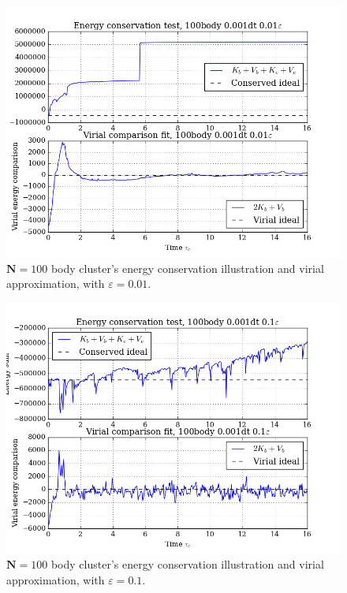 \documentclass[11pt,a4paper,notitlepage,twocolumn]{article}
\begin{document}
\begin{figure}
[H]\center
\includegraphics[scale=0.35]{../figs/ClusterEnConsvVirial_100body_dt1_eps1_dur16.png}
\caption{$\mathbf{N} = 100$ body cluster's energy conservation illustration and virial approximation, with $\varepsilon = 0.01$.}\label{fig:N100eps1consVirial}
\end{figure}
\begin{figure}
[H]\center
\includegraphics[scale=0.35]{../figs/ClusterEnConsvVirial_100body_dt1_eps10_dur16.png}
\caption{$\mathbf{N} = 100$ body cluster's energy conservation illustration and virial approximation, with $\varepsilon = 0.1$.}\label{fig:N100eps10consVirial}
\end{figure}
\end{document}

